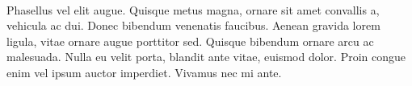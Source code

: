 \paragraph{} Phasellus vel elit augue. Quisque metus magna, ornare sit amet convallis a, vehicula ac dui. Donec bibendum venenatis faucibus. Aenean gravida lorem ligula, vitae ornare augue porttitor sed. Quisque bibendum ornare arcu ac malesuada. Nulla eu velit porta, blandit ante vitae, euismod dolor. Proin congue enim vel ipsum auctor imperdiet. Vivamus nec mi ante.
